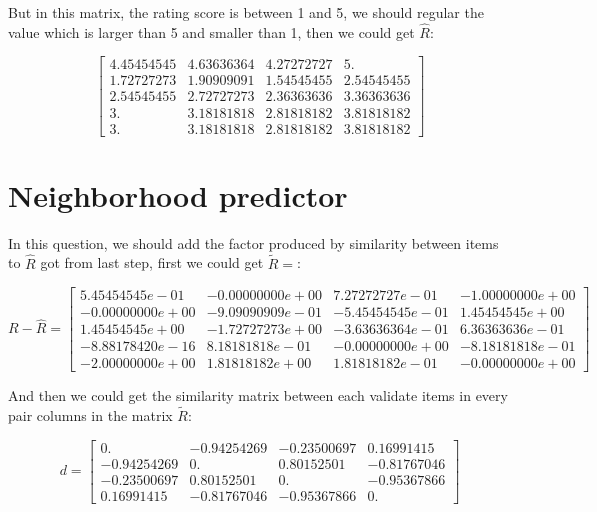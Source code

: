 \documentclass[12pt,a4paper]{article}
\begin{document}
But in this matrix, the rating score is between 1 and 5, we should regular the value which is larger than 5 and smaller than 1, then we could get $\hat{R}$:

\begin{equation}
\begin{bmatrix}
4.45454545 &  4.63636364 &  4.27272727 &  5. \\
1.72727273 &  1.90909091 &  1.54545455 &  2.54545455 \\
2.54545455 &  2.72727273 &  2.36363636 &  3.36363636 \\
3.        &  3.18181818 &  2.81818182 &  3.81818182 \\
3.        &  3.18181818 &  2.81818182 &  3.81818182
\end{bmatrix}
\end{equation}

\section{Neighborhood predictor}

In this question, we should add the factor produced by similarity between items to $\hat{R}$ got from last step, first we could get $\tilde{R} = $:

\begin{equation}
R - \hat{R}=
\begin{bmatrix}
5.45454545e-01&  -0.00000000e+00&   7.27272727e-01&-1.00000000e+00\\
-0.00000000e+00&  -9.09090909e-01&  -5.45454545e-01&1.45454545e+00\\
1.45454545e+00&  -1.72727273e+00&  -3.63636364e-01&6.36363636e-01\\
-8.88178420e-16&   8.18181818e-01&  -0.00000000e+00&-8.18181818e-01\\
-2.00000000e+00&   1.81818182e+00&   1.81818182e-01&-0.00000000e+00
\end{bmatrix}
\end{equation}

And then we could get the similarity matrix between each validate items in every pair columns in the matrix $\tilde{R}$:

\begin{equation}
d=
\begin{bmatrix}
0.        & -0.94254269& -0.23500697&  0.16991415\\
-0.94254269&  0.        &  0.80152501& -0.81767046\\
-0.23500697&  0.80152501&  0.        & -0.95367866\\
0.16991415& -0.81767046& -0.95367866&  0.
\end{bmatrix}
\end{equation}
\end{document}
